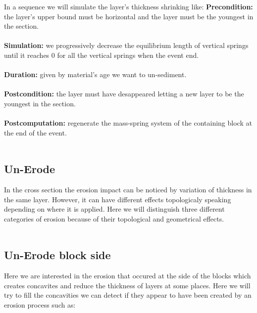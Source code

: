 \documentclass[12pt, a4paper]{memoir} %
\begin{document}
In a sequence we will simulate the layer's thickness shrinking like:
\textbf{Precondition:} the layer's upper bound must be horizontal and the layer must be the youngest in the section.\\\\
\textbf{Simulation:} we progressively decrease the equilibrium length of vertical springs until it reaches $0$ for all the vertical springs when the event end.\\\\
\textbf{Duration:} given by material's age we want to un-sediment.\\\\
\textbf{Postcondition:} the layer must have desappeared letting a new layer to be the youngest 
in the section.\\\\
\textbf{Postcomputation:} regenerate the mass-spring system of the containing block at the end of the event.\\\\

\subsection{Un-Erode}

In the cross section the erosion impact can be noticed by variation of thickness in the same layer. However, it can have different effects topologicaly speaking depending on where it is applied. Here we will distinguish three different categories of erosion because of their topological and geometrical effects.\\\\

\subsection{Un-Erode block side}

Here we are interested in the erosion that occured at the side of the blocks which creates concavites and reduce the thickness of layers at some places. Here we will try to fill the concavities we can detect if they appear to have been created by an erosion process such as:
\end{document}

